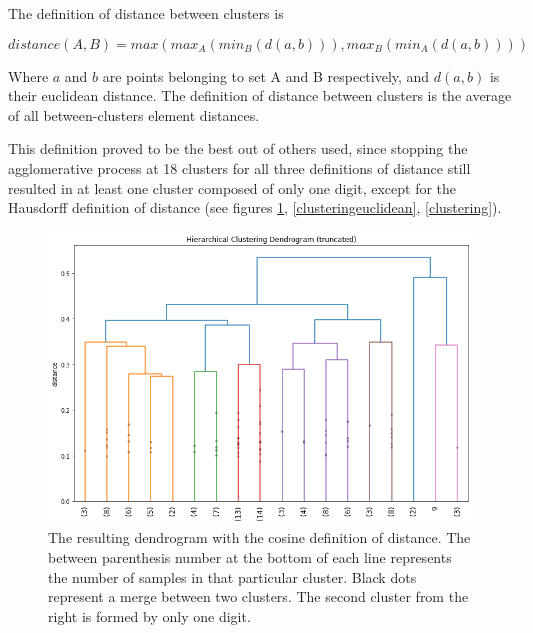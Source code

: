 \documentclass[a4paper]{report}
\begin{document}
The definition of distance between clusters is

\begin{equation}
    distance(A, B) = max(max_A(min_B(d(a,b))), max_B(min_A(d(a,b))))
\end{equation}

Where $a$ and $b$ are points belonging to set A and B respectively, and $d(a,b)$ is their euclidean distance.
The definition of distance between clusters is the average of all between-clusters element distances.

This definition proved to be the best out of others used, since stopping the agglomerative process at 18 clusters for all three definitions of distance still resulted in at least one cluster composed of only one digit, except for the Hausdorff definition of distance (see figures \ref{clusteringcosine}, \ref{clusteringeuclidean}, \ref{clustering}).

\begin{figure} [H]
	\centering
	\includegraphics [width=\textwidth]{d/cosine.png}
	\caption{The resulting dendrogram with the cosine definition of distance. The between parenthesis number at the bottom of each line represents the number of samples in that particular cluster. Black dots represent a merge between two clusters. The second cluster from the right is formed by only one digit.}
	\label{clusteringcosine}
\end{figure}
\end{document}

